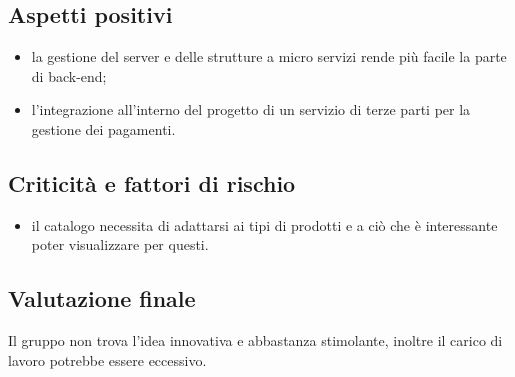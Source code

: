\subsection{Aspetti positivi}
\begin{itemize}
\item la gestione del server e delle strutture a micro servizi rende più facile la parte di back-end;
\item l'integrazione all'interno del progetto di un servizio di terze parti per la gestione dei pagamenti.
\end{itemize}

\subsection{Criticità e fattori di rischio}
\begin{itemize}
\item il catalogo necessita di adattarsi ai tipi di prodotti e a ciò che è interessante poter visualizzare per questi.
\end{itemize}

\subsection{Valutazione finale}
Il gruppo non trova l'idea innovativa e abbastanza stimolante, inoltre il carico di lavoro potrebbe essere eccessivo.
